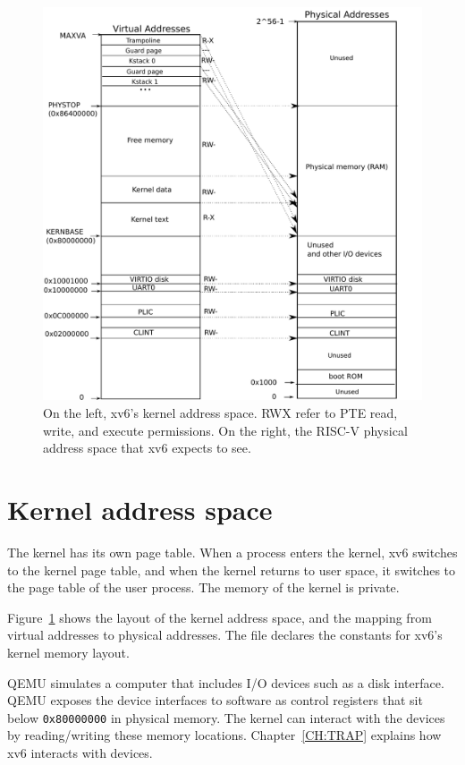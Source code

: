 \begin{figure}[h]
\centering
 \includegraphics[scale=0.65]{fig/xv6_layout.pdf}
\caption{On the left, xv6's kernel address space.
{\sf \small{RWX}}
refer to PTE read, write, and execute permissions.
On the right, the RISC-V physical address space that
xv6 expects to see.}
\label{fig:xv6_layout}
\end{figure}

\section{Kernel address space}
The kernel has its own page table.  When a process enters the kernel,
xv6 switches to the kernel page table, and when the kernel
returns to user space, it switches to the page table of the user
process.  The memory of the kernel is private.

Figure~\ref{fig:xv6_layout}
shows the layout of the kernel address space, and the mapping from
virtual addresses to physical addresses.  The file
declares the constants for xv6's kernel memory layout.

QEMU simulates a computer that includes I/O devices
such as a disk interface.
QEMU exposes the device interfaces to software as
control registers that sit below
\texttt{0x80000000}
in physical memory.
The kernel can interact with the devices by reading/writing
these memory locations.
Chapter~\ref{CH:TRAP} explains
how xv6 interacts with devices.

